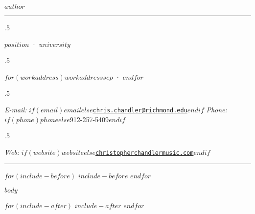 \documentclass[plain, titleabove]{simplecv}
\begin{document}
\thispagestyle{empty} 		%

\centerline{\Large \textsc{$author$}}

\vspace{2 mm}

\hrule

\vspace{2 mm}

\moveleft.5\hoffset\centerline{$position$ · $university$}
\moveleft.5\hoffset\centerline{$for(workaddress)$$workaddress$$sep$ · $endfor$}
\moveleft.5\hoffset\centerline{
	\emph{E-mail:} \href{mailto:}{\tt $if(email)$$email$$else$chris.chandler@richmond.edu$endif$}
	\hspace{1 mm}
	\emph{Phone:} $if(phone)$$phone$$else$912-257-5409$endif$}
\moveleft.5\hoffset\centerline{
	\emph{Web:} $if(website)$\href{$website$}{\tt $website$}$else$\href{http://christopherchandlermusic.com}{\tt christopherchandlermusic.com}$endif$}
\vspace{2 mm}

\hrule

$for(include-before)$
	$include-before$
$endfor$

$body$

$for(include-after)$
	$include-after$
$endfor$
\end{document}

